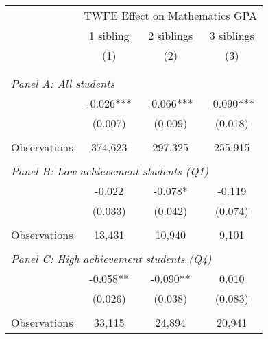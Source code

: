 \makeatletter
{}
{
\makeatother
\begin{tabular}{lccc}
\toprule
\cmidrule(lr){2-4}
& \multicolumn{3}{c}{TWFE Effect on Mathematics GPA} \\
\cmidrule(lr){2-4}
& 1 sibling & 2 siblings & 3 siblings  \\
\cmidrule(lr){2-2} \cmidrule(lr){3-3} \cmidrule(lr){4-4}
& (1) & (2) & (3)\\
\bottomrule
&  &  &  \\
&  &  &   \\
\multicolumn{4}{l}{\textit{Panel A: All students}} \\
\hspace{3mm}        &      -0.026***&      -0.066***&      -0.090***\\
                    &     (0.007)   &     (0.009)   &     (0.018)   \\
                    &               &               &               \\
\hspace{3mm}Observations&     374,623   &     297,325   &     255,915   \\
 
&  &  &   \\
\multicolumn{4}{l}{\textit{Panel B: Low achievement students (Q1)}} \\
\hspace{3mm}        &      -0.022   &      -0.078*  &      -0.119   \\
                    &     (0.033)   &     (0.042)   &     (0.074)   \\
                    &               &               &               \\
\hspace{3mm}Observations&      13,431   &      10,940   &       9,101   \\
 
&  &  &   \\
\multicolumn{4}{l}{\textit{Panel C: High achievement students (Q4)}} \\
\hspace{3mm}        &      -0.058** &      -0.090** &       0.010   \\
                    &     (0.026)   &     (0.038)   &     (0.083)   \\
                    &               &               &               \\
\hspace{3mm}Observations&      33,115   &      24,894   &      20,941   \\
 

\end{tabular}}
